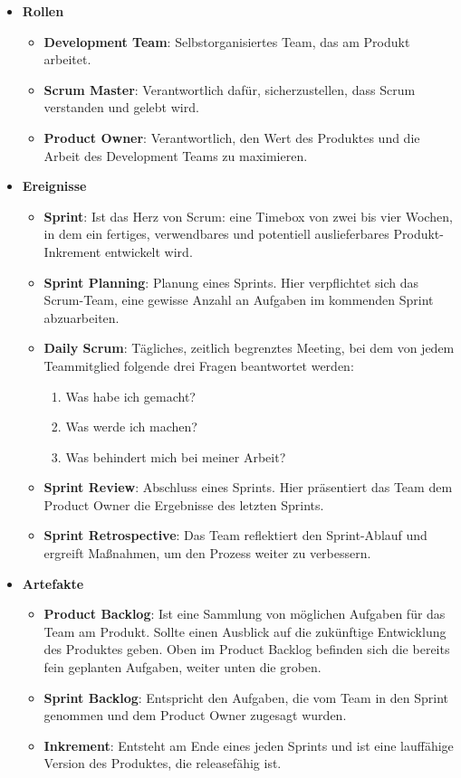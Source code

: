 \begin{itemize}
  \item \textbf{Rollen}
  \begin{itemize}
    \item \textbf{Development Team}: Selbstorganisiertes Team, das am Produkt arbeitet.
    \item \textbf{Scrum Master}: Verantwortlich dafür, sicherzustellen, dass Scrum verstanden und gelebt wird.
    \item \textbf{Product Owner}: Verantwortlich, den Wert des Produktes und die Arbeit des Development Teams zu maximieren.
  \end{itemize}
  \item \textbf{Ereignisse}
  \begin{itemize}
    \item \textbf{Sprint}: Ist das Herz von Scrum: eine Timebox von zwei bis vier Wochen, in dem ein fertiges, verwendbares und potentiell auslieferbares Produkt-Inkrement entwickelt wird.
    \item \textbf{Sprint Planning}: Planung eines Sprints. Hier verpflichtet sich das Scrum-Team, eine gewisse Anzahl an Aufgaben im kommenden Sprint abzuarbeiten.
    \item \textbf{Daily Scrum}: Tägliches, zeitlich begrenztes Meeting, bei dem von jedem Teammitglied folgende drei Fragen beantwortet werden:
    \begin{enumerate}
      \item Was habe ich gemacht?
      \item Was werde ich machen?
      \item Was behindert mich bei meiner Arbeit?
    \end{enumerate}
    \item \textbf{Sprint Review}: Abschluss eines Sprints. Hier präsentiert das Team dem Product Owner die Ergebnisse des letzten Sprints.
    \item \textbf{Sprint Retrospective}: Das Team reflektiert den Sprint-Ablauf und ergreift Maßnahmen, um den Prozess weiter zu verbessern.
  \end{itemize}
  \item \textbf{Artefakte}
  \begin{itemize}
    \item \textbf{Product Backlog}: Ist eine Sammlung von möglichen Aufgaben für das Team am Produkt. Sollte einen Ausblick auf die zukünftige Entwicklung des Produktes geben. Oben im Product Backlog befinden sich die bereits fein geplanten Aufgaben, weiter unten die groben.
    \item \textbf{Sprint Backlog}: Entspricht den Aufgaben, die vom Team in den Sprint genommen und dem Product Owner zugesagt wurden.
    \item \textbf{Inkrement}: Entsteht am Ende eines jeden Sprints und ist eine lauffähige Version des Produktes, die releasefähig ist.
  \end{itemize}
\end{itemize}

